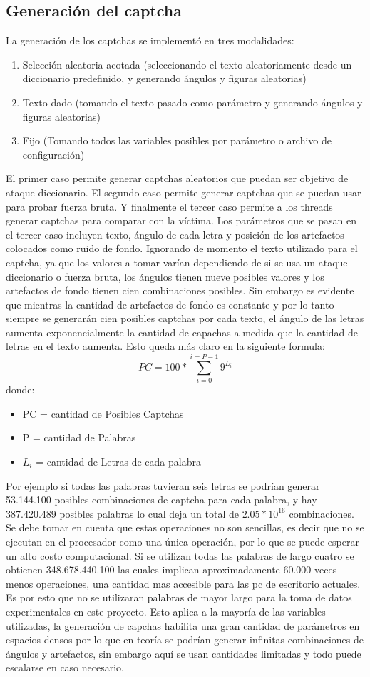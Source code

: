 \documentclass[conference]{IEEEtran}
\begin{document}
\subsection{Generación del captcha}
La generación de los captchas se implementó en tres modalidades:
\begin{enumerate}
   \item Selección aleatoria acotada (seleccionando el texto  aleatoriamente desde un diccionario predefinido, y generando ángulos y figuras aleatorias)
    \item Texto dado (tomando el texto  pasado como parámetro y generando ángulos y figuras aleatorias)
    \item Fijo (Tomando todos las variables posibles por parámetro o archivo de configuración)
\end{enumerate}
El primer caso permite generar captchas aleatorios que puedan ser objetivo de ataque diccionario. El segundo caso permite generar captchas que se puedan usar para probar fuerza bruta. Y finalmente el tercer caso permite a los threads generar captchas para comparar con la víctima. Los parámetros que se pasan en el tercer caso incluyen texto, ángulo de cada letra y posición de los artefactos colocados como ruido de fondo.\newline
Ignorando de momento el texto utilizado para el captcha, ya que los valores a tomar varían dependiendo de si se usa un ataque diccionario o fuerza bruta, los ángulos tienen nueve posibles valores y los artefactos de fondo tienen cien combinaciones posibles. Sin embargo es evidente que mientras la cantidad de artefactos de fondo es constante y por lo tanto siempre se generarán cien posibles captchas por cada texto, el ángulo de las letras aumenta exponencialmente la cantidad de capachas a medida que la cantidad de letras en el texto aumenta.
Esto queda más claro en la siguiente formula:
\[PC = 100 *\sum_{i = 0}^{i = P-1} 9^{L_i}\]
donde: 
\begin{itemize}
    \item PC = cantidad de Posibles Captchas
    \item P = cantidad de Palabras
    \item $L_i$ = cantidad de Letras de cada palabra
\end{itemize}
Por ejemplo si todas las palabras tuvieran seis letras se podrían generar 53.144.100 posibles combinaciones de captcha para cada palabra, y hay 387.420.489 posibles palabras lo cual deja un total de $2.05 * 10 ^{16}$ combinaciones. Se debe tomar en cuenta que estas operaciones no son sencillas, es decir que no se ejecutan en el procesador como una única operación, por lo que se puede esperar un alto costo computacional. Si se utilizan todas las palabras de largo cuatro se obtienen 348.678.440.100 las cuales implican aproximadamente 60.000 veces menos operaciones, una cantidad mas accesible para las pc de escritorio actuales. Es por esto que no se utilizaran palabras de mayor largo para la toma de datos experimentales en este proyecto. Esto aplica a la mayoría de las variables utilizadas, la generación de capchas habilita una gran cantidad de parámetros en espacios densos por lo que en teoría se podrían generar infinitas combinaciones de ángulos y artefactos, sin embargo aquí se usan cantidades limitadas y todo puede escalarse en caso necesario.
\end{document}
